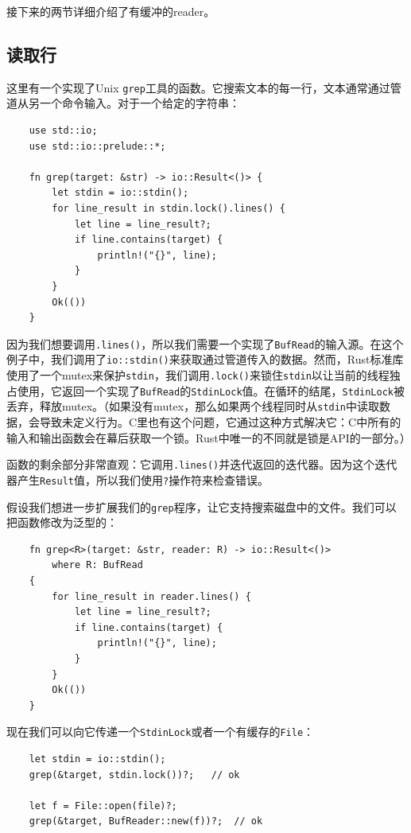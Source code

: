 接下来的两节详细介绍了有缓冲的reader。

\subsection{读取行}\label{ReadLines}
这里有一个实现了Unix \texttt{grep}工具的函数。它搜索文本的每一行，文本通常通过管道从另一个命令输入。对于一个给定的字符串：
\begin{verbatim}
    use std::io;
    use std::io::prelude::*;

    fn grep(target: &str) -> io::Result<()> {
        let stdin = io::stdin();
        for line_result in stdin.lock().lines() {
            let line = line_result?;
            if line.contains(target) {
                println!("{}", line);
            }
        }
        Ok(())
    }
\end{verbatim}

因为我们想要调用\texttt{.lines()}，所以我们需要一个实现了\texttt{BufRead}的输入源。在这个例子中，我们调用了\texttt{io::stdin()}来获取通过管道传入的数据。然而，Rust标准库使用了一个mutex来保护\texttt{stdin}，我们调用\texttt{.lock()}来锁住\texttt{stdin}以让当前的线程独占使用，它返回一个实现了\texttt{BufRead}的\texttt{StdinLock}值。在循环的结尾，\texttt{StdinLock}被丢弃，释放mutex。（如果没有mutex，那么如果两个线程同时从\texttt{stdin}中读取数据，会导致未定义行为。C里也有这个问题，它通过这种方式解决它：C中所有的输入和输出函数会在幕后获取一个锁。Rust中唯一的不同就是锁是API的一部分。）

函数的剩余部分非常直观：它调用\texttt{.lines()}并迭代返回的迭代器。因为这个迭代器产生\texttt{Result}值，所以我们使用\texttt{?}操作符来检查错误。

假设我们想进一步扩展我们的\texttt{grep}程序，让它支持搜索磁盘中的文件。我们可以把函数修改为泛型的：
\begin{verbatim}
    fn grep<R>(target: &str, reader: R) -> io::Result<()>
        where R: BufRead
    {
        for line_result in reader.lines() {
            let line = line_result?;
            if line.contains(target) {
                println!("{}", line);
            }
        }
        Ok(())
    }
\end{verbatim}

现在我们可以向它传递一个\texttt{StdinLock}或者一个有缓存的\texttt{File}：
\begin{verbatim}
    let stdin = io::stdin();
    grep(&target, stdin.lock())?;   // ok

    let f = File::open(file)?;
    grep(&target, BufReader::new(f))?;  // ok
\end{verbatim}

